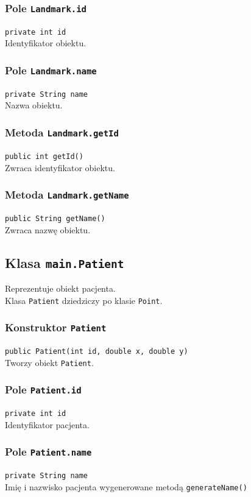 \documentclass{article}
\begin{document}
\subsubsection{Pole \texttt{Landmark.id}}
\texttt{private int id} \\
Identyfikator obiektu.

\subsubsection{Pole \texttt{Landmark.name}}
\texttt{private String name} \\
Nazwa obiektu.

\subsubsection{Metoda \texttt{Landmark.getId}}
\texttt{public int getId()} \\
Zwraca identyfikator obiektu.

\subsubsection{Metoda \texttt{Landmark.getName}}
\texttt{public String getName()} \\
Zwraca nazwę obiektu.

\subsection{Klasa \texttt{main.Patient}}
Reprezentuje obiekt pacjenta. \\
Klasa \texttt{Patient} dziedziczy po klasie \texttt{Point}.

\subsubsection{Konstruktor \texttt{Patient}}
\texttt{public Patient(int id, double x, double y)} \\
Tworzy obiekt \texttt{Patient}.

\subsubsection{Pole \texttt{Patient.id}}
\texttt{private int id} \\
Identyfikator pacjenta.

\subsubsection{Pole \texttt{Patient.name}}
\texttt{private String name} \\
Imię i nazwisko pacjenta wygenerowane metodą \texttt{generateName()}
\end{document}
